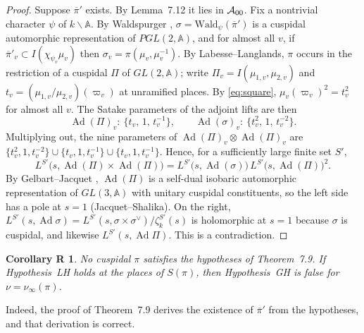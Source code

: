 \documentclass[12pt,letterpaper]{article}
\newcommand{\Ad}{\operatorname{Ad}}
\newcommand{\A}{\mathbb{A}}
\newcommand{\ov}[1]{\overline{#1}}
\theoremstyle{plain}
\newtheorem*{corR}{Corollary R}
\begin{document}
\begin{proof}
Suppose $\ov\pi'$ exists. By Lemma~7.12 it lies in ${\cal A}_{00}$. Fix a
nontrivial character $\psi$ of $k\backslash\A$. By Waldspurger
\cite{Wa1,Wa2}, $\sigma=\mathrm{Wald}_\psi(\ov\pi')$ is a cuspidal
automorphic representation of $PGL(2,\A)$, and for almost all $v$, if
$\ov\pi'_v\subset I(\chi_{\psi_v}\mu_v)$ then
$\sigma_v=\pi(\mu_v,\mu_v^{-1})$. By Labesse--Langlands, $\pi$ occurs in
the restriction of a cuspidal $\Pi$ of $GL(2,\A)$; write
$\Pi_v=I(\mu_{1,v},\mu_{2,v})$ and $t_v=(\mu_{1,v}/\mu_{2,v})(\varpi_v)$ at
unramified places. By \eqref{eq:square}, $\mu_v(\varpi_v)^2=t_v^2$ for
almost all $v$. The Satake parameters of the adjoint lifts are then
\[
\Ad(\Pi)_v:\ \{t_v,\,1,\,t_v^{-1}\},\qquad
\Ad(\sigma)_v:\ \{t_v^2,\,1,\,t_v^{-2}\}.
\]
Multiplying out, the nine parameters of $\Ad(\Pi)_v\otimes\Ad(\Pi)_v$ are
$\{t_v^{2},1,t_v^{-2}\}\cup\{t_v,1,t_v^{-1}\}\cup\{t_v,1,t_v^{-1}\}$.
Hence, for a sufficiently large finite set $S'$,
\[
L^{S'}\!\bigl(s,\Ad(\Pi)\times\Ad(\Pi)\bigr)
=L^{S'}\!\bigl(s,\Ad(\sigma)\bigr)\,L^{S'}\!\bigl(s,\Ad(\Pi)\bigr)^{2}.
\]
By Gelbart--Jacquet \cite{GJ78}, $\Ad(\Pi)$ is a self-dual isobaric
automorphic representation of $GL(3,\A)$ with unitary cuspidal
constituents, so the left side has a pole at $s=1$ (Jacquet--Shalika). On
the right, $L^{S'}(s,\Ad\sigma)=L^{S'}(s,\sigma\times\sigma^\vee)/\zeta_k^{S'}(s)$
is holomorphic at $s=1$ because $\sigma$ is cuspidal, and likewise
$L^{S'}(s,\Ad\Pi)$. This is a contradiction.
\end{proof}

\begin{corR}
No cuspidal $\pi$ satisfies the hypotheses of Theorem~7.9. If
Hypothesis~LH holds at the places of $S(\pi)$, then Hypothesis~GH is false
for $\nu=\nu_\infty(\pi)$.
\end{corR}

Indeed, the proof of Theorem~7.9 derives the existence of $\ov\pi'$ from
the hypotheses, and that derivation is correct.
\end{document}
